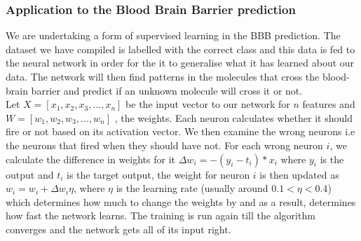 \documentclass[a4paper,12pt]{report}
\begin{document}
				\subsubsection{Application to the Blood Brain Barrier prediction}
				We are undertaking a form of supervised learning in the BBB prediction. The dataset we have compiled is labelled with the correct class and this data is fed to the neural network in order for the it to generalise what it has learned about our data. The network will then find patterns in the molecules that cross the blood-brain barrier and predict if an unknown molecule will cross it or not. \\
				Let $X = [x_1,x_2,x_3,...,x_n]$ be the input vector to our network for $n$ features and $W=[w_1,w_2,w_3,...,w_n]$ , the weights. Each neuron calculates whether it should fire or not based on its activation vector. We then examine the wrong neurons i.e the neurons that fired when they should have not. For each wrong neuron $i$, we calculate the difference in weights for it $\Delta w_i = -(y_i - t_i) * x_i$ where $y_i$ is the output and $t_i$ is the target output, the weight for neuron $i$ is then updated as $w_i = w_i + \Delta w_i\eta$, where $\eta$ is the learning rate (usually around $0.1 < \eta < 0.4$) which determines how much to change the weights by and as a result, determines how fast the network learns. The training is run again till the algorithm converges and the network gets all of its input right.
\end{document}
